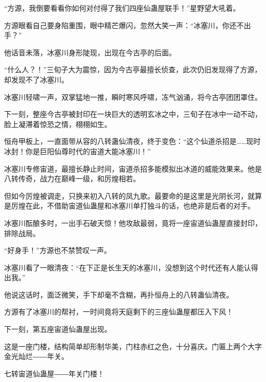 \begin{this_body}
“方源，我倒要看看你如何对付得了我们四座仙蛊屋联手！”星野望大吼着。

方源眼看自己要身陷重围，眼中精芒爆闪，忽然大笑一声：“冰塞川，你还不出手？”

他话音未落，冰塞川身形陡现，出现在今古亭的后面。

“什么人？！”三旬子大为震惊，因为今古亭最擅长侦查，此次仍旧发现得了方源，却发现不了冰塞川。

冰塞川轻啸一声，双掌猛地一推，瞬时寒风呼啸，冻气汹涌，将今古亭团团罩住。

下一刻，整座今古亭被封印在一块巨大的透明玄冰之中，三旬子在冰中一动不动，脸上凝滞着惊恐之情，栩栩如生。

恒舟甲板上，一直面带从容的八转蛊仙清夜，终于变色：“这个仙道杀招是……现时冰封！你是巨阳仙尊时代的宙道大能冰塞川！”

冰塞川专修宙道，最擅长静止时间，宙道杀招多能模拟出冰道的威能效果来。他是八转传奇，战力在巅峰一级，和厉煌相若。

但如今厉煌被调走，只换来初入八转的凤九歌。最要命的是这里是光阴长河，就算是厉煌在此，不借助宙道仙蛊屋和冰塞川单打独斗的话，也绝非是后者的对手。

冰塞川酝酿多时，一出手石破天惊！他攻敌最弱，竟将一座宙道仙蛊屋直接封印，排除战局。

“好身手！”方源也不禁赞叹一声。

冰塞川看了一眼清夜：“在下正是长生天的冰塞川，没想到这个时代还有人能认得出我。”

他说这话时，面泛微笑，手下却毫不含糊，再扑恒舟上的八转蛊仙清夜。

方源有了冰塞川的帮衬，一时间竟将天庭剩下的三座仙蛊屋都压入下风！

下一刻，第五座宙道仙蛊屋出现。

这是一座门楼，结构简单却形制华美，门柱赤红之色，十分喜庆。门匾上两个大字金光灿烂――年关。

七转宙道仙蛊屋――年关门楼！

\end{this_body}

